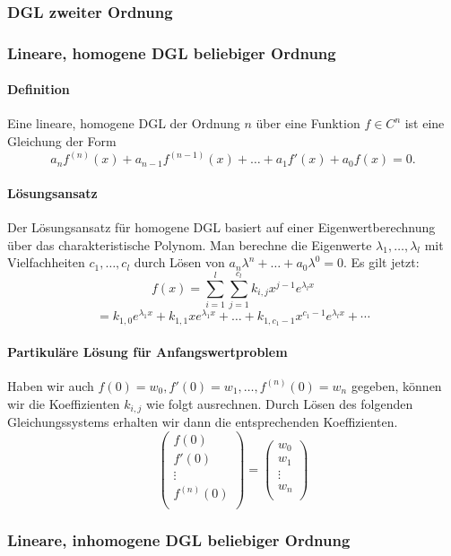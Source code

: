 \documentclass[a4paper, 9pt, DIV=24]{scrartcl}
\begin{document}
\subsubsection{DGL zweiter Ordnung}

\subsubsection{Lineare, homogene DGL beliebiger Ordnung}
\paragraph{Definition} Eine lineare, homogene DGL der Ordnung $n$ über eine Funktion $f \in C^{n}$ ist eine Gleichung der Form
\[ a_n f^{(n)}(x) + a_{n-1} f^{(n-1)}(x) + \dots + a_1 f'(x) + a_0 f(x) = 0. \]
\paragraph{Lösungsansatz}
Der Lösungsansatz für homogene DGL basiert auf einer Eigenwertberechnung über das charakteristische Polynom.
Man berechne die Eigenwerte $\lambda_1, \dots, \lambda_l$ mit Vielfachheiten $c_1, \dots, c_l$ durch Lösen von $a_n\lambda^n + \dots + a_0\lambda^0 = 0$.
Es gilt jetzt:
\[ f(x) = \sum_{i=1}^{l}\sum_{j=1}^{c_l}k_{i,j}x^{j-1}e^{\lambda_l x} \]
\[ = k_{1,0}e^{\lambda_1 x} + k_{1,1}xe^{\lambda_1 x} + \dots + k_{1,c_1-1}x^{c_1-1}e^{\lambda_l x} + \cdots \]
\paragraph{Partikuläre Lösung für Anfangswertproblem}
Haben wir auch $f(0) = w_0, f'(0) = w_1, \dots, f^{(n)}(0) = w_n$ gegeben,
können wir die Koeffizienten $k_{i,j}$ wie folgt ausrechnen.
Durch Lösen des folgenden Gleichungssystems erhalten wir dann die entsprechenden Koeffizienten.
\[
 \begin{pmatrix}
  f(0) \\
  f'(0) \\
  \vdots \\
  f^{(n)}(0) \\
 \end{pmatrix}
  =
 \begin{pmatrix}
  w_0 \\
  w_1 \\
  \vdots \\
  w_n \\
 \end{pmatrix}
\]

\subsubsection{Lineare, inhomogene DGL beliebiger Ordnung}
\end{document}
